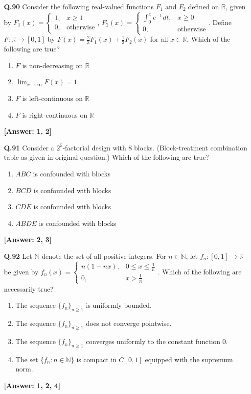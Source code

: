 \documentclass[12pt,a4paper]{article}
\newcommand{\ans}[1]{\quad\textcolor{anscolor}{\textbf{[Answer: #1]}}}
\begin{document}
\textbf{Q.90} Consider the following real-valued functions $F_1$ and $F_2$ defined on $\mathbb{R}$, given by $F_1(x)=\begin{cases}1,&x\ge1\\0,&\text{otherwise}\end{cases}$, $F_2(x)=\begin{cases}\int_0^xe^{-t}\,dt,&x\ge0\\0,&\text{otherwise}\end{cases}$. Define $F:\mathbb{R}\to[0,1]$ by $F(x)=\tfrac{2}{3}F_1(x)+\tfrac{1}{3}F_2(x)$ for all $x\in\mathbb{R}$. Which of the following are true?
\begin{enumerate}[label=\arabic*.]
\item $F$ is non-decreasing on $\mathbb{R}$ \item $\lim_{x\to\infty}F(x)=1$
\item $F$ is left-continuous on $\mathbb{R}$ \item $F$ is right-continuous on $\mathbb{R}$
\end{enumerate}\ans{1, 2}

\textbf{Q.91} Consider a $2^5$-factorial design with 8 blocks. (Block-treatment combination table as given in original question.) Which of the following are true?
\begin{enumerate}[label=\arabic*.]
\item $ABC$ is confounded with blocks \item $BCD$ is confounded with blocks
\item $CDE$ is confounded with blocks \item $ABDE$ is confounded with blocks
\end{enumerate}\ans{2, 3}

\textbf{Q.92} Let $\mathbb{N}$ denote the set of all positive integers. For $n\in\mathbb{N}$, let $f_n:[0,1]\to\mathbb{R}$ be given by $f_n(x)=\begin{cases}n(1-nx),&0\le x\le\tfrac{1}{n}\\0,&x>\tfrac{1}{n}\end{cases}$. Which of the following are necessarily true?
\begin{enumerate}[label=\arabic*.]
\item The sequence $\{f_n\}_{n\ge1}$ is uniformly bounded.
\item The sequence $\{f_n\}_{n\ge1}$ does not converge pointwise.
\item The sequence $\{f_n\}_{n\ge1}$ converges uniformly to the constant function 0.
\item The set $\{f_n:n\in\mathbb{N}\}$ is compact in $C[0,1]$ equipped with the supremum norm.
\end{enumerate}\ans{1, 2, 4}
\end{document}
